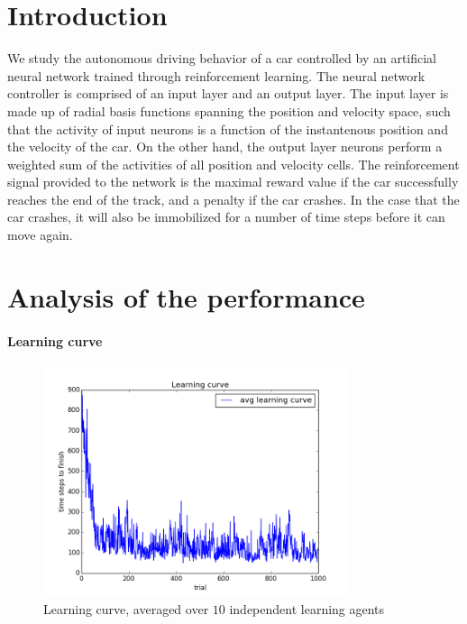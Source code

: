 \section{Introduction}
We study the autonomous driving behavior of a car controlled by an artificial neural network trained through reinforcement learning. The neural network controller is comprised of an input layer and an output layer. The input layer is made up of radial basis functions spanning the position and velocity space, such that the activity of input neurons is a function of the instantenous position and the velocity of the car. On the other hand, the output layer neurons perform a weighted sum of the activities of all position and velocity cells. The reinforcement signal provided to the network is the maximal reward value if the car successfully reaches the end of the track, and a penalty if the car crashes. In the case that the car crashes, it will also be immobilized for a number of time steps before it can move again. 

\section{Analysis of the performance}

\paragraph{Learning curve}

\begin{figure}[h!]
\centering
\includegraphics[width=0.8\textwidth]{figures/learning_curve.png}
\caption{\label{fig:lcurve}Learning curve, averaged over $10$ independent
learning agents}
\end{figure}

